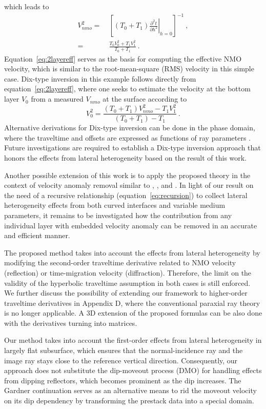 which leads to
\begin{align}
\nonumber
    V^2_{nmo} =&~\left[ (T_0+T_1) \left.\frac{\partial^2 t}{\partial h^2 }\right\rvert_{h=0} \right]^{-1}~, \\
\label{eq:2layereff}
    =&~\frac{T_0V^2_0 + T_1V^2_1}{T_0+T_1}~.
\end{align}
Equation~\ref{eq:2layereff} serves as the basis for computing the effective NMO velocity, which is similar to the root-mean-square (RMS) velocity in this simple case. Dix-type inversion in this example follows directly from equation~\ref{eq:2layereff}, where one seeks to estimate the velocity at the bottom layer $V_0$ from a measured $V_{nmo}$ at the surface according to
\begin{equation}
    V^2_0 = \frac{(T_0+T_1)V^2_{nmo} - T_1 V^2_1}{(T_0+T_1) - T_1}~.
\end{equation}
Alternative derivations for Dix-type inversion can be done in the phase domain, where the traveltime and offsets are expressed as functions of ray parameters \cite[]{tsvankinbook,zoneinterval,korenravvetriclinic}.
Future investigations are required to establish a Dix-type inversion approach that honors the effects from lateral heterogeneity based on the result of this work.

Another possible extension of this work is to apply the proposed theory in the context of velocity anomaly removal similar to \cite{blias2009}, \cite{takanashitsvankin11}, and \cite{takanashitsvankin12}. In light of our result on the need of a recursive relationship (equation~\ref{eq:recursion}) to collect lateral heterogeneity effects from both curved interfaces and variable medium parameters, it remains to be investigated how the contribution from any individual layer with embedded velocity anomaly can be removed in an accurate and efficient manner.

The proposed method takes into account the effects from lateral heterogeneity by modifying the second-order traveltime derivative related to NMO velocity (reflection) or time-migration velocity (diffraction). Therefore, the limit on the validity of the hyperbolic traveltime assumption in both cases is still enforced. We further discuss the possibility of extending our framework to higher-order traveltime derivatives in Appendix D, where the conventional paraxial ray theory is no longer applicable. A 3D extension of the proposed formulas can be also done with the derivatives turning into matrices.

Our method takes into account the first-order effects from lateral heterogeneity in largely flat subsurface, which ensures that the normal-incidence ray and the image ray stays close to the reference vertical direction. Consequently, our approach does not substitute the dip-moveout process (DMO) for handling effects from dipping reflectors, which becomes prominent as the dip increases. The Gardner continuation \cite[]{gardner} serves as an alternative means to rid the moveout velocity on its dip dependency by transforming the prestack data into a special domain.

